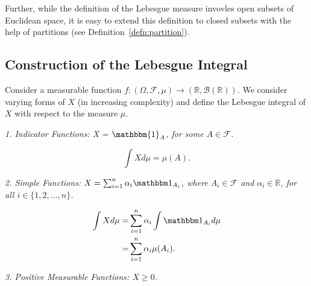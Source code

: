 \documentclass[10pt, oneside]{article}
\newcommand{\R}{\mathbb{R}}
\begin{document}
Further, while the definition of the Lebesgue measure invovles open subsets of Euclidean 
space, it is easy to extend this definition to closed subsets with the help of partitions
(see Definition~\ref{defn:partition}).  

\subsection{Construction of the Lebesgue Integral}
Consider a measurable function $f \colon (\Omega, \mathcal{F}, \mu) \to (\R,\mathcal{B}(\R))$. 
We consider varying forms of $X$ (in increasing complexity) and define the Lebesgue integral 
of $X$ with respect to the measure $\mu$. 

\emph{1. Indicator Functions:  X = $\mathbbm{1}_A$, for some $A \in \mathcal{F}$. }

\[\int{X d\mu} = \mu(A). \]

\emph{2. Simple Functions: $X = \sum_{i=1}^{n}\alpha_{i}\ind_{A_{i}}$, where $A_{i} \in \mathcal{F}$
and $\alpha_{i} \in \R$, for all $i \in \{1,2,\dots,n\}$.} 

\begin{align*}
    \int{X d\mu} = & \sum_{i=1}^{n}\alpha_{i} \int{\ind_{A_{i}} d\mu} \\
                 = & \sum_{i=1}^{n}\alpha_{i} \mu(A_{i}). 
\end{align*}

\emph{3. Positive Measurable Functions: $X \geq 0$. }


\clearpage
\end{document}
